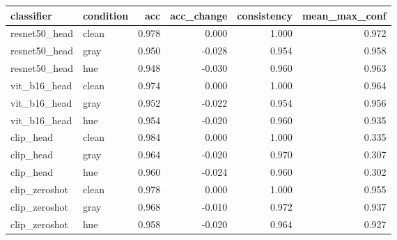\begin{tabular}{llrrrr}
\toprule
classifier & condition & acc & acc_change & consistency & mean_max_conf \\
\midrule
resnet50_head & clean & 0.978 & 0.000 & 1.000 & 0.972 \\
resnet50_head & gray & 0.950 & -0.028 & 0.954 & 0.958 \\
resnet50_head & hue & 0.948 & -0.030 & 0.960 & 0.963 \\
vit_b16_head & clean & 0.974 & 0.000 & 1.000 & 0.964 \\
vit_b16_head & gray & 0.952 & -0.022 & 0.954 & 0.956 \\
vit_b16_head & hue & 0.954 & -0.020 & 0.960 & 0.935 \\
clip_head & clean & 0.984 & 0.000 & 1.000 & 0.335 \\
clip_head & gray & 0.964 & -0.020 & 0.970 & 0.307 \\
clip_head & hue & 0.960 & -0.024 & 0.960 & 0.302 \\
clip_zeroshot & clean & 0.978 & 0.000 & 1.000 & 0.955 \\
clip_zeroshot & gray & 0.968 & -0.010 & 0.972 & 0.937 \\
clip_zeroshot & hue & 0.958 & -0.020 & 0.964 & 0.927 \\
\bottomrule
\end{tabular}
